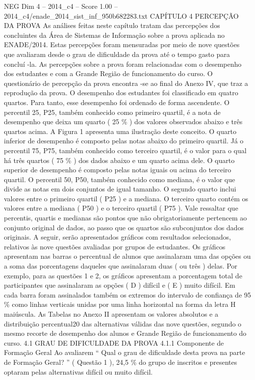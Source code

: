 \begin{textsample}{NEG Dim 4 – 2014\_c4 – Score 1.00 – 2014\_c4/enade\_2014\_sist\_inf\_950b682283.txt}  \label{ex:f4_neg_158}
CAPÍTULO 4 PERCEPÇÃO DA PROVA As análises feitas neste capítulo tratam das percepções dos concluintes da Área de Sistemas de Informação sobre a prova aplicada no ENADE/2014.
Estas percepções foram mensuradas por meio de nove questões que avaliaram desde o grau de dificuldade da prova até o tempo gasto para concluí -la.
As percepções sobre a prova foram relacionadas com o desempenho dos estudantes e com a Grande Região de funcionamento do curso.
O questionário de percepção da prova encontra -se ao final do Anexo IV, que traz a reprodução da prova.
O desempenho dos estudantes foi classificado em quatro quartos.
Para tanto, esse desempenho foi ordenado de forma ascendente.
O percentil 25, P25, também conhecido como primeiro quartil, é a nota de desempenho que deixa um quarto ( 25 \% ) dos valores observados abaixo e três quartos acima.
A Figura 1 apresenta uma ilustração deste conceito.
O quarto inferior de desempenho é composto pelas notas abaixo do primeiro quartil.
Já o percentil 75, P75, também conhecido como terceiro quartil, é o valor para o qual há três quartos ( 75 \% ) dos dados abaixo e um quarto acima dele.
O quarto superior de desempenho é composto pelas notas iguais ou acima do terceiro quartil.
O percentil 50, P50, também conhecido como mediana, é o valor que divide as notas em dois conjuntos de igual tamanho.
O segundo quarto inclui valores entre o primeiro quartil ( P25 ) e a mediana.
O terceiro quarto contém os valores entre a mediana ( P50 ) e o terceiro quartil ( P75 ).
Vale ressaltar que percentis, quartis e medianas são pontos que não obrigatoriamente pertencem ao conjunto original de dados, ao passo que os quartos são subconjuntos dos dados originais.
A seguir, serão apresentados gráficos com resultados selecionados, relativos às nove questões avaliadas por grupos de estudantes.
Os gráficos apresentam nas barras o percentual de alunos que assinalaram uma das opções ou a soma das porcentagens daqueles que assinalaram duas ( ou três ) delas.
Por exemplo, para as questões 1 e 2, os gráficos apresentam a porcentagem total de participantes que assinalaram as opções ( D ) difícil e ( E ) muito difícil.
Em cada barra foram assinalados também os extremos do intervalo de confiança de 95 \% como linhas verticais unidas por uma linha horizontal na forma da letra H maiúscula.
As Tabelas no Anexo II apresentam os valores absolutos e a distribuição percentual20 das alternativas válidas das nove questões, segundo o mesmo recorte de desempenho dos alunos e Grande Região de funcionamento do curso. 4.1 GRAU DE DIFICULDADE DA PROVA 4.1.1 Componente de Formação Geral Ao avaliarem “ Qual o grau de dificuldade desta prova na parte de Formação Geral? ” ( Questão 1 ), 24,5 \% do grupo de inscritos e presentes optaram pelas alternativas difícil ou muito difícil.

\end{textsample}

